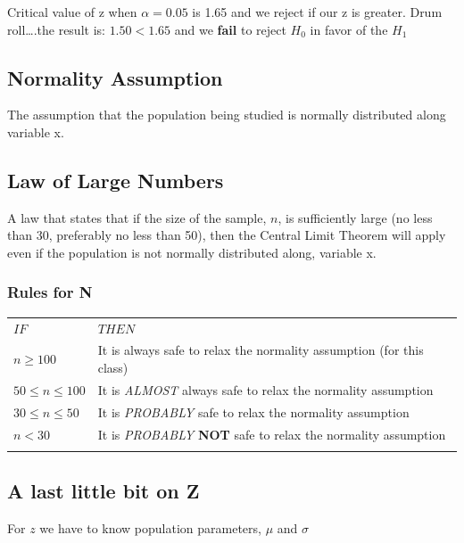 \documentclass[]{article}
\begin{document}
Critical value of z when $\alpha=0.05$ is 1.65 and we reject if our z is
greater. Drum roll\ldots{}.the result is: $1.50 < 1.65$ and we
\textbf{fail} to reject $H_0$ in favor of the $H_1$

\subsection{Normality Assumption}\label{normality-assumption}

The assumption that the population being studied is normally distributed
along variable x.

\subsection{Law of Large Numbers}\label{law-of-large-numbers}

A law that states that if the size of the sample, $n$, is sufficiently
large (no less than 30, preferably no less than 50), then the Central
Limit Theorem will apply even if the population is not normally
distributed along, variable x.

\subsubsection{Rules for N}\label{rules-for-n}

\begin{longtable}[c]{@{}ll@{}}
\toprule\addlinespace
$IF$ & $THEN$
\\\addlinespace
\midrule\endhead
$n ≥ 100$ & It is always safe to relax the normality assumption (for
this class)
\\\addlinespace
$50≤n≤100$ & It is \emph{ALMOST} always safe to relax the normality
assumption
\\\addlinespace
$30≤n≤50$ & It is \emph{PROBABLY} safe to relax the normality assumption
\\\addlinespace
$n < 30$ & It is \emph{PROBABLY} \textbf{NOT} safe to relax the
normality assumption
\\\addlinespace
\bottomrule
\end{longtable}

\subsection{A last little bit on Z}\label{a-last-little-bit-on-z}

For $z$ we have to know population parameters, $\mu$ and $\sigma$
\end{document}
